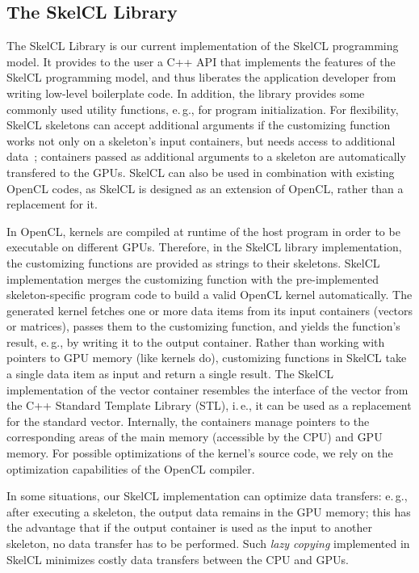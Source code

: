 \subsection{The SkelCL Library}
The SkelCL Library is our current implementation of the SkelCL programming model.
It provides to the user a C++ API that implements the features of the SkelCL programming model, and thus liberates the application developer from writing low-level boilerplate code.
In addition, the library provides some commonly used utility functions, e.\,g., for program initialization.
For flexibility, SkelCL skeletons can accept additional arguments if the customizing function works not only on a skeleton's input containers, but needs access to additional data~\cite{StKG-11};
containers passed as additional arguments to a skeleton are automatically transfered to the GPUs.
SkelCL can also be used in combination with existing OpenCL codes, as SkelCL is designed as an extension of OpenCL, rather than a replacement for it.

In OpenCL, kernels are compiled at runtime of the host program in order to be executable on different GPUs.
Therefore, in the SkelCL library implementation, the customizing functions are provided as strings to their skeletons.
SkelCL implementation merges the customizing function with the pre-implemented skeleton-specific program code to build a valid OpenCL kernel automatically.
The generated kernel fetches one or more data items from its input containers (vectors or matrices), passes them to the customizing function, and yields the function's result, e.\,g., by writing it to the output container.
Rather than working with pointers to GPU memory (like kernels do), customizing functions in SkelCL take a single data item as input and return a single result.
The SkelCL implementation of the vector container resembles the interface of the vector from the C++ Standard Template Library (STL), i.\,e., it can be used as a replacement for the standard vector.
Internally, the containers manage pointers to the corresponding areas of the main memory (accessible by the CPU) and GPU memory.
For possible optimizations of the kernel's source code, we rely on the optimization capabilities of the OpenCL compiler.

In some situations, our SkelCL implementation can optimize data transfers:
e.\,g., after executing a skeleton, the output data remains in the GPU memory;
this has the advantage that if the output container is used as the input to another skeleton, no data transfer has to be performed.
Such \emph{lazy copying} implemented in SkelCL minimizes costly data transfers between the CPU and GPUs.




